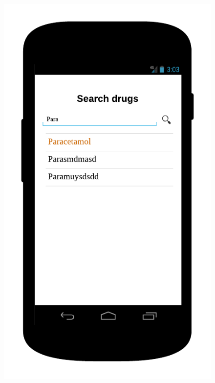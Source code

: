 \begin{description}
\begin{figure}
\begin{minipage}{.5\textwidth}
  \includegraphics[width=.7\linewidth]{Images/mockups/browse.png}
\end{minipage}
\end{figure}


\end{description}

